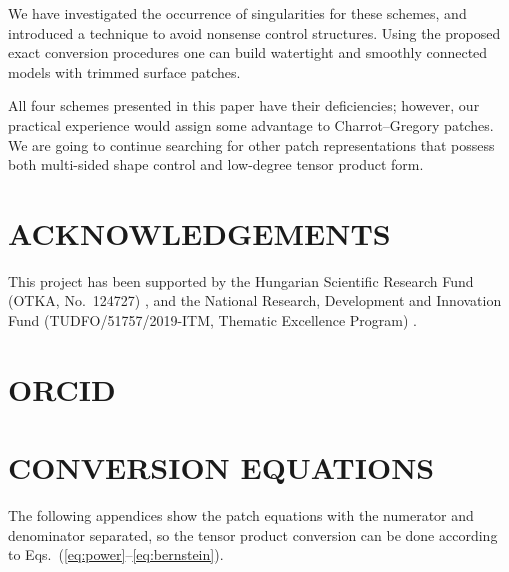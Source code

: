 \documentclass[9pt,academicons]{article}
\begin{document}
We have investigated the occurrence of singularities for these schemes,
and introduced a technique to avoid nonsense control structures.
Using the proposed exact conversion procedures one can build watertight
and smoothly connected models with trimmed surface patches.

All four schemes presented in this paper have their deficiencies; however, our
practical experience would assign some advantage to Charrot--Gregory
patches. We are going to continue searching for other patch representations
that possess both multi-sided shape control and low-degree tensor product form.

\section*{ACKNOWLEDGEMENTS}
This project has been supported by the Hungarian Scientific Research Fund (OTKA, No.~124727)%
, and the National Research, Development and Innovation Fund (TUDFO/51757/2019-ITM,
Thematic Excellence Program)%
.

\section*{ORCID}

\appendix
\section{CONVERSION EQUATIONS}
\label{app:conversion-eqs}
The following appendices show the patch equations
with the numerator and denominator separated,
so the tensor product conversion can be done
according to Eqs.~(\ref{eq:power}--\ref{eq:bernstein}).
\end{document}
